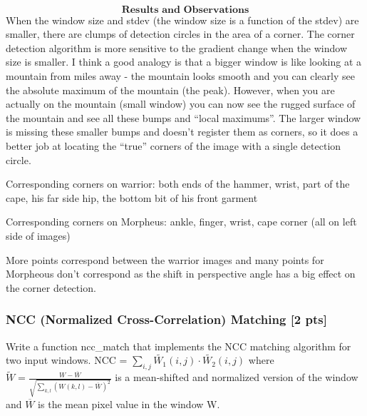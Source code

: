 \documentclass[11pt]{article}
\begin{document}
    \begin{center}
    \end{center}
    { \hspace*{\fill} \\}
    
    \[\textbf{Results and Observations}\] When the window size and stdev
(the window size is a function of the stdev) are smaller, there are
clumps of detection circles in the area of a corner. The corner
detection algorithm is more sensitive to the gradient change when the
window size is smaller. I think a good analogy is that a bigger window
is like looking at a mountain from miles away - the mountain looks
smooth and you can clearly see the absolute maximum of the mountain (the
peak). However, when you are actually on the mountain (small window) you
can now see the rugged surface of the mountain and see all these bumps
and ``local maximums''. The larger window is missing these smaller bumps
and doesn't register them as corners, so it does a better job at
locating the ``true'' corners of the image with a single detection
circle.

Corresponding corners on warrior: both ends of the hammer, wrist, part
of the cape, his far side hip, the bottom bit of his front garment

Corresponding corners on Morpheus: ankle, finger, wrist, cape corner
(all on left side of images)

More points correspond between the warrior images and many points for
Morpheous don't correspond as the shift in perspective angle has a big
effect on the corner detection.

    \hypertarget{ncc-normalized-cross-correlation-matching-2-pts}{%
\subsubsection{NCC (Normalized Cross-Correlation) Matching {[}2
pts{]}}\label{ncc-normalized-cross-correlation-matching-2-pts}}

Write a function ncc\_match that implements the NCC matching algorithm
for two input windows. NCC =
\(\sum_{i,j}\tilde{W_1} (i,j)\cdot \tilde{W_2} (i,j)\) where
\(\tilde{W} = \frac{W - \overline{W}}{\sqrt{\sum_{k,l}(W(k,l) - \overline{W})^2}}\)
is a mean-shifted and normalized version of the window and
\(\overline{W}\) is the mean pixel value in the window W.
\end{document}
